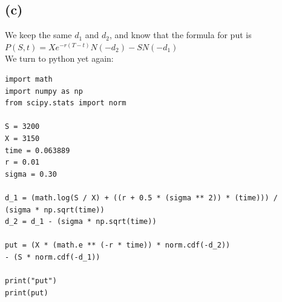 \documentclass{article}
\begin{document}
{\subsection*{(c)}

We keep the same $d_1$ and $d_2$, and know that the formula for put is $P(S, t) = Xe^{-r(T - t)}N(-d_2) - SN(-d_1)$ \\
We turn to python yet again:
\begin{verbatim}
import math
import numpy as np
from scipy.stats import norm

S = 3200
X = 3150
time = 0.063889
r = 0.01
sigma = 0.30

d_1 = (math.log(S / X) + ((r + 0.5 * (sigma ** 2)) * (time))) / 
(sigma * np.sqrt(time))
d_2 = d_1 - (sigma * np.sqrt(time))

put = (X * (math.e ** (-r * time)) * norm.cdf(-d_2)) 
- (S * norm.cdf(-d_1))

print("put")
print(put)
\end{verbatim}
\newpage
}
\end{document}
